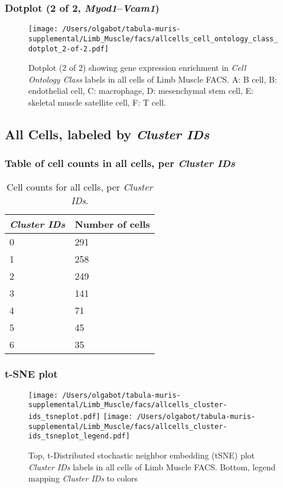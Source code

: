 \clearpage

\subsubsection{Dotplot (2 of 2, \emph{Myod1}--\emph{Vcam1})}
\begin{figure}[h]
\centering
\texttt{[image: /Users/olgabot/tabula-muris-supplemental/Limb\_Muscle/facs/allcells\_cell\_ontology\_class\_dotplot\_2-of-2.pdf]}

\caption{ Dotplot (2 of 2)  showing gene expression enrichment in \emph{Cell Ontology Class} labels in all cells of Limb Muscle FACS. A: B cell, B: endothelial cell, C: macrophage, D: mesenchymal stem cell, E: skeletal muscle satellite cell, F: T cell.}
\end{figure}


\clearpage

\subsection{All Cells, labeled by \emph{Cluster IDs}}
\subsubsection{Table of cell counts in all cells, per \emph{Cluster IDs}}\begin{table}[h]
\centering
\label{my-label}
\begin{tabular}{@{}ll@{}}
\toprule

\emph{Cluster IDs}& Number of cells \\ \midrule
0 & 291 \\

1 & 258 \\

2 & 249 \\

3 & 141 \\

4 & 71 \\

5 & 45 \\

6 & 35 \\
\bottomrule
\end{tabular}
\caption{Cell counts for all cells, per \emph{Cluster IDs}.}
\end{table}

\clearpage
\subsubsection{t-SNE plot}
\begin{figure}[h]
\centering
\texttt{[image: /Users/olgabot/tabula-muris-supplemental/Limb\_Muscle/facs/allcells\_cluster-ids\_tsneplot.pdf]}
\texttt{[image: /Users/olgabot/tabula-muris-supplemental/Limb\_Muscle/facs/allcells\_cluster-ids\_tsneplot\_legend.pdf]}
\caption{Top, t-Distributed stochastic neighbor embedding (tSNE) plot  \emph{Cluster IDs} labels in all cells of Limb Muscle FACS. Bottom, legend mapping \emph{Cluster IDs} to colors}
\end{figure}


